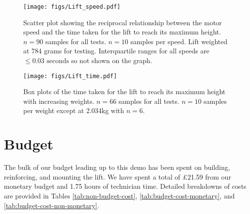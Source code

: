 \documentclass{article}
\begin{document}
\begin{figure}
  \begin{center}
    \texttt{[image: figs/Lift\_speed.pdf]}
    \caption{Scatter plot showing the reciprocal relationship between the motor speed and the time taken for the lift to reach its maximum height. $n = 90$ samples for all tests. $n = 10$ samples per speed. Lift weighted at 784 grams for testing. Interquartile ranges for all speeds are $\leq 0.03 \text{ seconds}$ so not shown on the graph.}
  \label{fig:speed-testing}
  \end{center}
\end{figure}

\begin{figure}
  \begin{center}
    \texttt{[image: figs/Lift\_time.pdf]}
    \caption{Box plots of the time taken for the lift to reach its maximum height with increasing weights. $n = 66$ samples for all tests. $n = 10$ samples per weight except at 2.034kg with $n = 6$.}
    \label{fig:weight-testing}
  \end{center}
\end{figure}

\section{Budget}
The bulk of our budget leading up to this demo has been spent on building, reinforcing, and mounting the lift. We have spent a total of \pounds 21.59 from our monetary budget and 1.75 hours of technician time. Detailed breakdowns of costs are provided in Tables \ref{tab:non-budget-cost}, \ref{tab:budget-cost-monetary}, and \ref{tab:budget-cost-non-monetary}.

\begin{table}[h]
\begin{center}
\caption{Non-budgeted monetary costs at demo \demoNumber.}
\label{tab:non-budget-cost}
\end{center}
\end{table}
\end{document}
